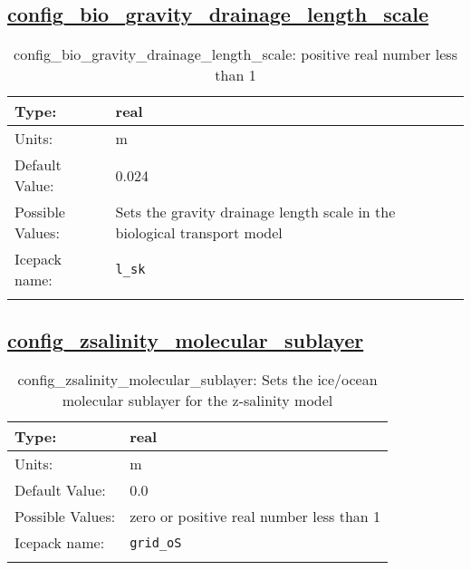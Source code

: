 \subsection[config\_bio\_gravity\_drainage\_length\_scale]{\hyperref[sec:nm_tab_biogeochemistry]{config\_bio\_gravity\_drainage\_length\_scale}}
\label{subsec:nm_sec_config_bio_gravity_drainage_length_scale}
\begin{center}
\begin{longtable}{| p{2.0in} || p{4.0in} |}
    \hline
    Type: & real \\
    \hline
    Units: & \si{m} \\
    \hline
    Default Value: & 0.024 \\
    \hline
    Possible Values: & Sets the gravity drainage length scale in the biological transport model \\
    \hline
    \hline
    Icepack name: & \verb+l_sk+ \\
    \caption{config\_bio\_gravity\_drainage\_length\_scale: positive real number less than 1}
\end{longtable}
\end{center}
\subsection[config\_zsalinity\_molecular\_sublayer]{\hyperref[sec:nm_tab_biogeochemistry]{config\_zsalinity\_molecular\_sublayer}}
\label{subsec:nm_sec_config_zsalinity_molecular_sublayer}
\begin{center}
\begin{longtable}{| p{2.0in} || p{4.0in} |}
    \hline
    Type: & real \\
    \hline
    Units: & \si{m} \\
    \hline
    Default Value: & 0.0 \\
    \hline
    Possible Values: & zero or positive real number less than 1 \\
    \hline
    \hline
    Icepack name: & \verb+grid_oS+ \\
    \caption{config\_zsalinity\_molecular\_sublayer: Sets the ice/ocean molecular sublayer for the z-salinity model}
\end{longtable}
\end{center}
